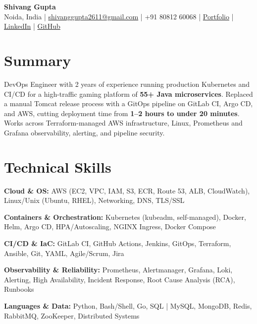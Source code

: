 \documentclass[10pt, letterpaper]{article}
\begin{document}
\begin{center}
    {\huge \textbf{Shivang Gupta}} \\ \vspace{5pt}
    Noida, India \;|\; \href{mailto:shivanggupta2611@gmail.com}{shivanggupta2611@gmail.com} \;|\; +91 80812 60068 \;|\;
    \href{https://shivanggupta.in}{Portfolio} \;|\; \href{https://www.linkedin.com/in/shivang21007/}{LinkedIn} \;|\; \href{https://github.com/shivang21007}{GitHub}
\end{center}

\section*{Summary}
\vspace{0pt}
DevOps Engineer with 2 years of experience running production Kubernetes and CI/CD for a high-traffic gaming platform of \textbf{55+ Java microservices}. Replaced a manual Tomcat release process with a GitOps pipeline on GitLab CI, Argo CD, and AWS, cutting deployment time from \textbf{1--2 hours to under 20 minutes}. Works across Terraform-managed AWS infrastructure, Linux, Prometheus and Grafana observability, alerting, and pipeline security.

\section*{Technical Skills}
\vspace{0pt}
\begin{list}{}{%
    \setlength{\leftmargin}{0pt}%
    \setlength{\itemindent}{0pt}%
    \setlength{\labelwidth}{0pt}%
    \setlength{\labelsep}{0pt}%
    \setlength{\topsep}{2pt}%
    \setlength{\itemsep}{1pt}%
    \setlength{\parsep}{0pt}%
}
    \item \textbf{Cloud \& OS:} AWS (EC2, VPC, IAM, S3, ECR, Route 53, ALB, CloudWatch), Linux/Unix (Ubuntu, RHEL), Networking, DNS, TLS/SSL
    \item \textbf{Containers \& Orchestration:} Kubernetes (kubeadm, self-managed), Docker, Helm, Argo CD, HPA/Autoscaling, NGINX Ingress, Docker Compose
    \item \textbf{CI/CD \& IaC:} GitLab CI, GitHub Actions, Jenkins, GitOps, Terraform, Ansible, Git, YAML, Agile/Scrum, Jira
    \item \textbf{Observability \& Reliability:} Prometheus, Alertmanager, Grafana, Loki, Alerting, High Availability, Incident Response, Root Cause Analysis (RCA), Runbooks
    \item \textbf{Languages \& Data:} Python, Bash/Shell, Go, SQL \;|\; MySQL, MongoDB, Redis, RabbitMQ, ZooKeeper, Distributed Systems
\end{list}
\end{document}
